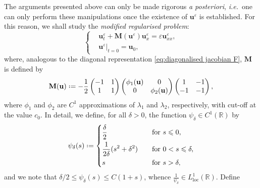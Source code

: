 \documentclass[11pt,a4paper,reqno]{amsart}
\numberwithin{equation}{section}
\theoremstyle{definition}
\theoremstyle{remark}
\newcommand{\bu}{\mathbf{u}}
\newcommand{\loc}{\mathrm{loc}}
\newcommand{\bM}{\mathbf{M}}
\renewcommand{\leq}{\leqslant}
\newcommand*{\defeq}{\mathrel{\vcenter{\baselineskip0.5ex \lineskiplimit0pt
                     \hbox{\scriptsize.}\hbox{\scriptsize.}}}%
                     =}
\begin{document}
{The arguments presented above can only be made rigorous \emph{a posteriori}, \textit{i.e.}~one can only perform these manipulations once the existence of $\bu^\varepsilon$ is established. For this reason, we shall study the \emph{modified regularised problem}: 
\begin{equation}\label{eq:modified regularised problem}
   \left\lbrace \begin{aligned} &\bu^\varepsilon_t + \bM(\bu^\varepsilon) \bu^\varepsilon_x = \varepsilon \bu^\varepsilon_{xx}, \\ 
   &\bu^\varepsilon|_{t=0} = \bu_0, 
   \end{aligned}\right. 
\end{equation}
where, analogous to the diagonal representation \eqref{eq:diagonalised jacobian F}, $\bM$ is defined by 
\begin{equation}\label{eq:modified flux}
    \bM(\bu) \defeq -\frac{1}{2}\left( \begin{matrix}
        -1 & 1 \\ 
        1 & 1
    \end{matrix} \right) \left( \begin{matrix}
        \phi_1(\bu) & 0 \\ 
        0 & \phi_2(\bu) 
    \end{matrix} \right) \left( \begin{matrix}
        1 & -1 \\ 
        -1 & -1
    \end{matrix} \right), 
\end{equation}
where $\phi_1$ and $\phi_2$ are $C^1$ approximations of $\lambda_1$ and $\lambda_2$, respectively, with cut-off at the value $c_0$. In detail, we define, for all $\delta>0$, the function $\psi_\delta \in C^1(\mathbb{R})$ by 
\begin{equation}
    \label{psi_delta_definition}
    \begin{split}
    \psi_\delta(s)  \defeq  \left\lbrace \begin{aligned}
        & \frac{\delta}{2} \quad && \text{for } s \leq 0, \\ 
        & \frac{1}{2\delta}(s^2+\delta^2) \quad && \text{for } 0 < s \leq \delta, \\ 
        & s \quad && \text{for } s > \delta, 
    \end{aligned} \right.
    \end{split}
\end{equation}
and we note that $\delta/2 \leq \psi_\delta(s) \leq C(1+s)$, whence $\frac{1}{\psi_\delta} \in L^1_{\loc}(\mathbb{R})$. Define 
}
\end{document}
